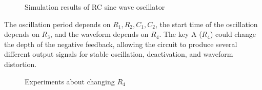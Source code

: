 \documentclass[conference]{IEEEtran}
\begin{document}
\begin{figure}[!h]
\centering
{}
\quad
{}
\caption{Simulation results of RC sine wave oscillator}
\label{fig5-2/3}
\end{figure}

The oscillation period depends on $R_1, R_2, C_1, C_2$, the start time of the oscillation depends on $R_3$, and the waveform depends on $R_4$.  The key A ($R_4$) could change the depth of the negative feedback, allowing the circuit to produce several different output signals for stable oscillation, deactivation, and waveform distortion.


\begin{figure}[!h]
\centering
{}
\quad
{}
\caption{Experiments about changing $R_4$}
\label{fig5-4/5}
\end{figure}
\end{document}
